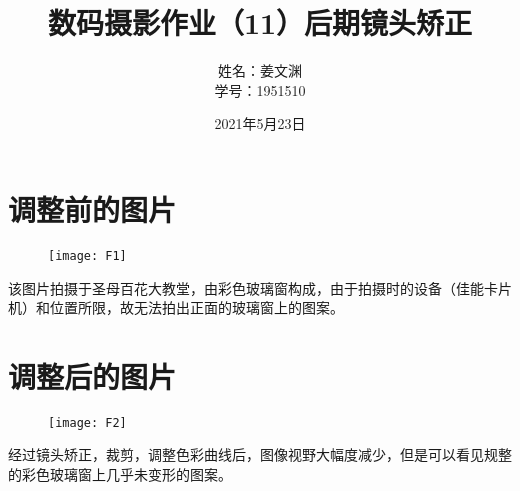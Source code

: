 \documentclass[cn,black,10pt,normal]{elegantnote}
\title{数码摄影作业（11）后期镜头矫正}
\author{姓名：姜文渊\\学号：1951510}
\date{2021年5月23日}
\begin{document}
\maketitle

\section{调整前的图片}

\begin{figure}[H]
    \centering
    \texttt{[image: F1]}
    \label{F-02}
\end{figure}

该图片拍摄于圣母百花大教堂，由彩色玻璃窗构成，由于拍摄时的设备（佳能卡片机）和位置所限，故无法拍出正面的玻璃窗上的图案。

\section{调整后的图片}

\begin{figure}[H]
    \centering
    \texttt{[image: F2]}
    \label{F-01}
\end{figure}

经过镜头矫正，裁剪，调整色彩曲线后，图像视野大幅度减少，但是可以看见规整的彩色玻璃窗上几乎未变形的图案。


\end{document}
